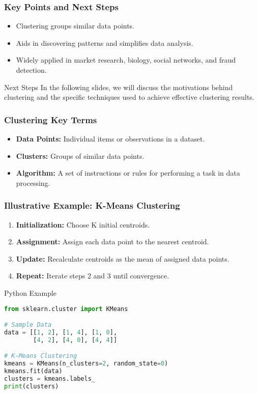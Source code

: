 \documentclass[aspectratio=169]{beamer}
\begin{document}
\begin{frame}[fragile]
    \frametitle{Key Points and Next Steps}

    \begin{itemize}
        \item Clustering groups similar data points.
        \item Aids in discovering patterns and simplifies data analysis.
        \item Widely applied in market research, biology, social networks, and fraud detection.
    \end{itemize}

    \begin{block}{Next Steps}
        In the following slides, we will discuss the motivations behind clustering and the specific techniques used to achieve effective clustering results.
    \end{block}
\end{frame}

\begin{frame}[fragile]
    \frametitle{Clustering Key Terms}

    \begin{itemize}
        \item \textbf{Data Points:} Individual items or observations in a dataset.
        \item \textbf{Clusters:} Groups of similar data points.
        \item \textbf{Algorithm:} A set of instructions or rules for performing a task in data processing.
    \end{itemize}
\end{frame}

\begin{frame}[fragile]
    \frametitle{Illustrative Example: K-Means Clustering}

    \begin{enumerate}
        \item \textbf{Initialization:} Choose K initial centroids.
        \item \textbf{Assignment:} Assign each data point to the nearest centroid.
        \item \textbf{Update:} Recalculate centroids as the mean of assigned data points.
        \item \textbf{Repeat:} Iterate steps 2 and 3 until convergence.
    \end{enumerate}

    \begin{block}{Python Example}
        \begin{lstlisting}[language=Python]
from sklearn.cluster import KMeans

# Sample Data
data = [[1, 2], [1, 4], [1, 0],
        [4, 2], [4, 0], [4, 4]]

# K-Means Clustering
kmeans = KMeans(n_clusters=2, random_state=0)
kmeans.fit(data)
clusters = kmeans.labels_
print(clusters)
        \end{lstlisting}
    \end{block}
\end{frame}
\end{document}
